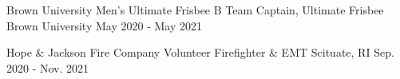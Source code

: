 

\begin{cventries}

\vspace{-1mm}
  \cventry
    {Brown University Men's Ultimate Frisbee B Team} %
    {Captain, Ultimate Frisbee} %
    {Brown University} %
    {May 2020 - May 2021} %
    {}

\vspace{-4mm}
  \cventry
    {Hope \& Jackson Fire Company} %
    {Volunteer Firefighter \& EMT} %
    {Scituate, RI} %
    {Sep. 2020 - Nov. 2021} %
    {}

\vspace{-4mm}
\end{cventries}
